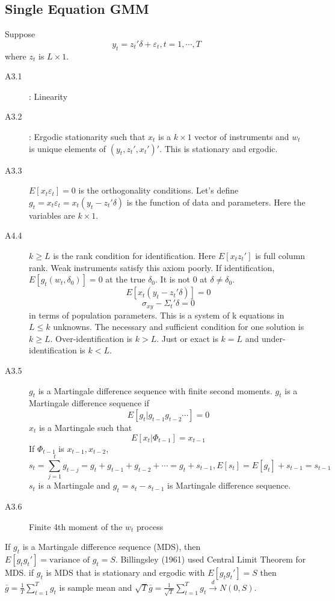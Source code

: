 \documentclass[11pt, a4paper, oneside]{article}
\theoremstyle{definition}
\theoremstyle{proposition}
\theoremstyle{corollary}
\theoremstyle{lemma}
\theoremstyle{theorem}
\begin{document}
\subsection{Single Equation GMM}
Suppose $$y_t = z_t'\delta + \varepsilon_t, t = 1, \cdots ,T$$ 
where $z_t$ is $L\times 1$. 
\begin{description}
\item[A3.1]: Linearity
\item[A3.2]: Ergodic stationarity such that $x_t$ is a $k\times 1$ vector of instruments and $w_t$ is unique elements of $(y_t, z_t', x_t')'$. This is stationary and ergodic. 
\item[A3.3] $E[x_t\varepsilon_t] = 0$ is the orthogonality conditions. Let's define $g_t = x_t \varepsilon_t = x_t(y_t - z_t'\delta)$ is the function of data and parameters. Here the variables are $k \times 1$.
\item[A4.4] $k \geq L$ is the rank condition for identification. Here $E[x_tz_t']$ is full column rank. Weak instruments satisfy this axiom poorly. If identification, $E[g_t(w_t, \delta_0)] = 0$ at the true $\delta_0$. It is not 0 at $\delta \neq \delta_0$. 
$$E[x_t(y_t - z_t'\delta)] = 0$$ 
$$\sigma_{xy}  -\Sigma_t'\delta = 0$$ in terms of population parameters. This is a system of k equations in $L \leq k$ unknowns. The necessary and sufficient condition for one solution is $k \geq L$.  Over-identification is $k > L$. Just or exact is $k =  L $ and under-identification is $ k < L$. 
\item[A3.5] $g_t$ is a Martingale difference sequence with finite second moments. $g_t$ is a Martingale difference sequence if 
$$E[g_t|g_{t-1}g_{t-2}\cdots] = 0$$ $x_t$ is a Martingale such that
$$E[x_t|\Phi_{t-1}] = x_{t-1}$$
If $\Phi_{t-1}$ is $x_{t-1}, x_{t-2}$,
$$s_t = \sum_{j=1}^{t}g_{t-j} = g_t + g_{t-1}+g_{t-2}+\cdots=  g_t+s_{t-1}, E[s_t] = E[g_t] + s_{t-1} = s_{t-1}$$
$s_t$ is a Martingale and $g_t = s_t - s_{t-1}$ is Martingale difference sequence.
\item[A3.6] Finite 4th moment of the $w_t$ process 
\end{description}

If $g_t$ is a Martingale difference sequence (MDS), then $E[g_tg_t'] = \text{variance of } g_t = S$. Billingsley (1961) used Central Limit Theorem for MDS. if $g_t$ is MDS that is stationary and ergodic with $E[g_tg_t']= S$ then $\bar{g} = \frac{1}{T}\sum_{t=1}^T g_t$ is sample mean and $\sqrt{T}\bar{g} = \frac{1}{\sqrt{T}} \sum_{t=1}^T g_t \overset{d}{\to} N(0, S)$. 
\end{document}
